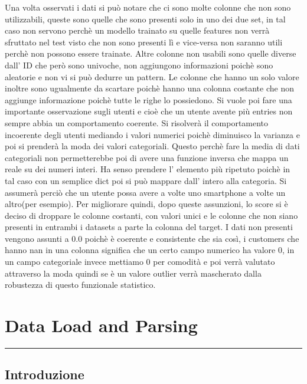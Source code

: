 \documentclass[11pt]{article}
\begin{document}
Una volta osservati i dati si può notare che ci sono molte colonne che
non sono utilizzabili, queste sono quelle che sono presenti solo in uno
dei due set, in tal caso non servono perchè un modello trainato su
quelle features non verrà sfruttato nel test visto che non sono presenti
lì e vice-versa non saranno utili perchè non possono essere trainate.
Altre colonne non usabili sono quelle diverse dall' ID che però sono
univoche, non aggiungono informazioni poichè sono aleatorie e non vi si
può dedurre un pattern. Le colonne che hanno un solo valore inoltre sono
ugualmente da scartare poichè hanno una colonna costante che non
aggiunge informazione poichè tutte le righe lo possiedono. Si vuole poi
fare una importante osservazione sugli utenti e cioè che un utente
avente più entries non sempre abbia un comportamento coerente. Si
risolverà il comportamento incoerente degli utenti mediando i valori
numerici poichè diminuisco la varianza e poi si prenderà la moda dei
valori categoriali. Questo perchè fare la media di dati categoriali non
permetterebbe poi di avere una funzione inversa che mappa un reale su
dei numeri interi. Ha senso prendere l' elemento più ripetuto poichè in
tal caso con un semplice dict poi si può mappare dall' intero alla
categoria. Si assumerà perciò che un utente possa avere a volte uno
smartphone a volte un altro(per esempio). Per migliorare quindi, dopo
queste assunzioni, lo score si è deciso di droppare le colonne costanti,
con valori unici e le colonne che non siano presenti in entrambi i
datasets a parte la colonna del target. I dati non presenti vengono
assunti a 0.0 poichè è coerente e consistente che sia così, i customers
che hanno nan in una colonna significa che un certo campo numerico ha
valore 0, in un campo categoriale invece mettiamo 0 per comodità e poi
verrà valutato attraverso la moda quindi se è un valore outlier verrà
mascherato dalla robustezza di questo funzionale statistico.

    \section{Data Load and Parsing}\label{data-load-and-parsing}

\begin{center}\rule{0.5\linewidth}{\linethickness}\end{center}

\subsection{Introduzione}\label{introduzione}
\end{document}
